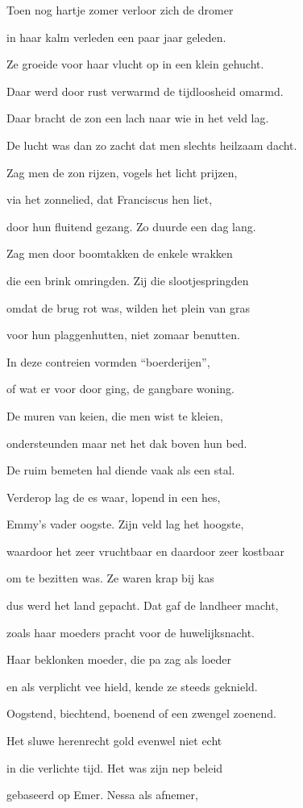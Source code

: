Toen nog hartje zomer
verloor zich de dromer

in haar kalm verleden
een paar jaar geleden.

Ze groeide voor haar vlucht
op in een klein gehucht.

Daar werd door rust verwarmd
de tijdloosheid omarmd.

Daar bracht de zon een lach
naar wie in het veld lag.

De lucht was dan zo zacht
dat men slechts heilzaam dacht.

Zag men de zon rijzen,
vogels het licht prijzen,

via het zonnelied,
dat Franciscus hen liet,

door hun fluitend gezang.
Zo duurde een dag lang.

Zag men door boomtakken
de enkele wrakken

die een brink omringden.
Zij die slootjespringden

omdat de brug rot was,
wilden het plein van gras

voor hun plaggenhutten,
niet zomaar benutten.

In deze contreien
vormden “boerderijen”,

of wat er voor door ging,
de gangbare woning.

De muren van keien,
die men wist te kleien,

ondersteunden maar net
het dak boven hun bed.

De ruim bemeten hal
diende vaak als een stal.

Verderop lag de es
waar, lopend in een hes,

Emmy’s vader oogste.
Zijn veld lag het hoogste,

waardoor het zeer vruchtbaar
en daardoor zeer kostbaar

om te bezitten was.
Ze waren krap bij kas

dus werd het land gepacht.
Dat gaf de landheer macht,

zoals haar moeders pracht
voor de huwelijksnacht.

Haar beklonken moeder,
die pa zag als loeder

en als verplicht vee hield,
kende ze steeds geknield.

Oogstend, biechtend, boenend
of een zwengel zoenend.

Het sluwe herenrecht
gold evenwel niet echt

in die verlichte tijd.
Het was zijn nep beleid

gebaseerd op Emer.
Nessa als afnemer,

